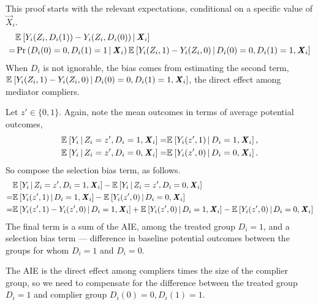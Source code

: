 This proof starts with the relevant expectations, conditional on a specific value of $\vec X_i$.
\begin{align*}
    &\mathbb{E}_{} \left[  Y_i(Z_i, D_i(1)) - Y_i(Z_i, D_i(0)) \, \middle\vert \, \boldsymbol{\mathit{X}}_i \right] \\
    =& \Pr\left( D_i(0) = 0, D_i(1) = 1 \, \middle\vert \, \boldsymbol{\mathit{X}}_i \right)
        \mathbb{E}_{} \left[  Y_i(Z_i, 1) - Y_i(Z_i, 0) \, \middle\vert \, D_i(0) = 0, D_i(1) = 1, \boldsymbol{\mathit{X}}_i \right]
\end{align*}
When $D_i$ is not ignorable, the bias comes from estimating the second term,
\\ $\mathbb{E}_{} \left[  Y_i(Z_i, 1) - Y_i(Z_i, 0) \, \middle\vert \, D_i(0) = 0, D_i(1) = 1, \boldsymbol{\mathit{X}}_i \right]$, the direct effect among mediator compliers.

Let $z' \in \{ 0, 1 \}$.
Again, note the mean outcomes in terms of average potential outcomes,
\begin{align*}
    \mathbb{E}_{} \left[ Y_i \, \middle\vert \, Z_i = z', D_i = 1, \boldsymbol{\mathit{X}}_i \right]
    =& \mathbb{E}_{} \left[ Y_i(z', 1) \, \middle\vert \, D_i = 1, \boldsymbol{\mathit{X}}_i \right], \\
    \mathbb{E}_{} \left[ Y_i \, \middle\vert \, Z_i = z', D_i = 0, \boldsymbol{\mathit{X}}_i \right]
    =& \mathbb{E}_{} \left[ Y_i(z', 0) \, \middle\vert \, D_i = 0, \boldsymbol{\mathit{X}}_i \right].
\end{align*}
So compose the selection bias term, as follows.
\begin{align*}
    & \mathbb{E}_{} \left[ Y_i \, \middle\vert \, Z_i = z', D_i = 1, \boldsymbol{\mathit{X}}_i \right]
    - \mathbb{E}_{} \left[ Y_i \, \middle\vert \, Z_i = z', D_i = 0, \boldsymbol{\mathit{X}}_i \right] \\
    =& \mathbb{E}_{} \left[ Y_i(z', 1) \, \middle\vert \, D_i = 1, \boldsymbol{\mathit{X}}_i \right]
        - \mathbb{E}_{} \left[ Y_i(z', 0) \, \middle\vert \, D_i = 0, \boldsymbol{\mathit{X}}_i \right] \\
    =& \mathbb{E}_{} \left[ Y_i(z', 1) - Y_i(z', 0) \, \middle\vert \, D_i = 1, \boldsymbol{\mathit{X}}_i \right]
    + \mathbb{E}_{} \left[ Y_i(z', 0) \, \middle\vert \, D_i = 1, \boldsymbol{\mathit{X}}_i \right] - \mathbb{E}_{} \left[ Y_i(z', 0) \, \middle\vert \, D_i = 0, \boldsymbol{\mathit{X}}_i \right]
\end{align*}
The final term is a sum of the AIE, among the treated group $D_i = 1$, and a selection bias term --- difference in baseline potential outcomes between the groups for whom $D_i = 1$ and $D_i = 0$.

The AIE is the direct effect among compliers times the size of the complier group, so we need to compensate for the difference between the treated group $D_i = 1$ and complier group $D_i(0) = 0, D_i(1) = 1$.


